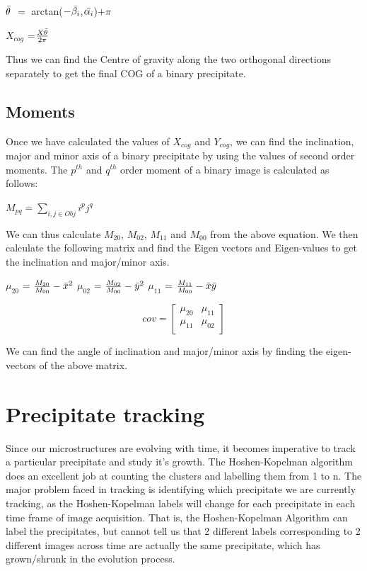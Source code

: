 \documentclass[12pt, a4paper]{report}
\begin{document}
$\Bar{\theta}$ $=$ arctan($-\Bar{\beta_i}$,$\Bar{\alpha_i}$)$+\pi$

\textbf{$X_{cog}$} =$\frac{X{\Bar{\theta}}}{2\pi}$

Thus we can find the Centre of gravity along the two orthogonal directions separately to get the final COG of a binary precipitate.

\subsection{Moments}
Once we have calculated the values of $X_{cog}$ and $Y_{cog}$, we can find the inclination, major and minor axis of a binary precipitate by using the values of second order moments. The $p^{th}$ and $q^{th}$ order moment of a binary image is calculated as follows:

$M_{pq} = \sum_{i,j{\in}Obj}i^pj^q$

We can thus calculate $M_{20}$, $M_{02}$, $M_{11}$ and $M_{00}$ from the above equation. We then calculate the following matrix and find the Eigen vectors and Eigen-values to get the inclination and major/minor axis.

$\mu_{20}$ = $\frac{M_{20}}{M_{00}}-{\Bar{x}}^2$
$\mu_{02}$ = $\frac{M_{02}}{M_{00}}-{\Bar{y}}^2$
$\mu_{11}$ = $\frac{M_{11}}{M_{00}}-{\Bar{x}}{\Bar{y}}$

$$
cov =
\begin{bmatrix}
\mu_{20} & \mu_{11} \\
\mu_{11} & \mu_{02} \\
\end{bmatrix}
$$

We can find the angle of inclination and major/minor axis by finding the eigen-vectors of the above matrix.


\section{Precipitate tracking}

Since our microstructures are evolving with time, it becomes imperative to track a particular precipitate and study it's growth. The Hoshen-Kopelman algorithm does an excellent job at counting the clusters and labelling them from 1 to n. The major problem faced in tracking is identifying which precipitate we are currently tracking, as the Hoshen-Kopelman labels will change for each precipitate in each time frame of image acquisition. That is, the Hoshen-Kopelman Algorithm can label the precipitates, but cannot tell us that 2 different labels corresponding to 2 different images across time are actually the same precipitate, which has grown/shrunk in the evolution process. 
\end{document}
